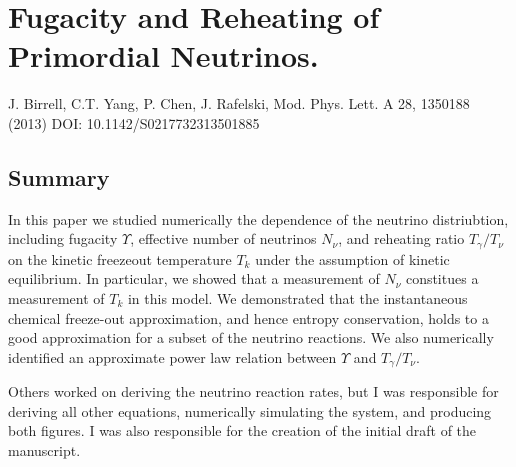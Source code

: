 \chapter{Fugacity and Reheating of Primordial Neutrinos.}\label{app:chem_freezeout}
J. Birrell, C.T. Yang, P. Chen, J. Rafelski, Mod. Phys. Lett. A 28, 1350188 (2013) 
DOI: 10.1142/S0217732313501885 

\section*{ Summary}

In this paper we studied numerically the dependence of the neutrino distriubtion, including fugacity $\Upsilon$, effective number of neutrinos $N_\nu$, and reheating ratio $T_\gamma/T_\nu$ on the kinetic freezeout temperature $T_k$ under the assumption of kinetic equilibrium. In particular, we showed that  a measurement of $N_\nu$ constitues a measurement of $T_k$ in this model. We demonstrated that the instantaneous chemical freeze-out approximation, and hence entropy conservation,  holds to a good approximation for a subset of the neutrino reactions.  We also numerically identified an approximate power law relation between $\Upsilon$ and $T_\gamma/T_\nu$.

Others worked on deriving the neutrino reaction rates, but I was responsible for deriving all other equations, numerically simulating the system, and producing both figures. I was also responsible for the creation of the initial draft of the manuscript.
